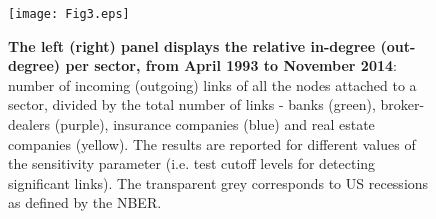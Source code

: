 \documentclass[a4paper,10pt]{article}
\begin{document}
\begin{figure}[!h]
\texttt{[image: Fig3.eps]}
\caption{{\bf The left (right) panel displays the relative in-degree (out-degree) per sector, from April 1993 to November 2014}: number of incoming  (outgoing) 
links  of all the nodes attached to a sector,  divided by the total number of links - banks (green), broker-dealers (purple), insurance companies (blue) and 
real estate companies (yellow). The results are reported for different values of the sensitivity parameter (i.e. test cutoff 
levels for detecting significant links). The transparent grey corresponds to US recessions as defined by the NBER.}
\label{fig:3}
\end{figure}
\end{document}
